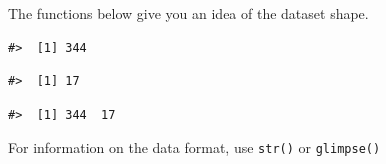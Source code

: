 \documentclass[letterpaper,9pt,twoside,]{pinp}
\begin{document}
The functions below give you an idea of the dataset shape.

\begin{Shaded}
\begin{Highlighting}[]
\end{Highlighting}
\end{Shaded}

\begin{ShadedResult}
\begin{verbatim}
#>  [1] 344
\end{verbatim}
\end{ShadedResult}

\begin{Shaded}
\begin{Highlighting}[]
\end{Highlighting}
\end{Shaded}

\begin{ShadedResult}
\begin{verbatim}
#>  [1] 17
\end{verbatim}
\end{ShadedResult}

\begin{Shaded}
\begin{Highlighting}[]
\end{Highlighting}
\end{Shaded}

\begin{ShadedResult}
\begin{verbatim}
#>  [1] 344  17
\end{verbatim}
\end{ShadedResult}

For information on the data format, use \texttt{str()} or
\texttt{glimpse()}

\begin{Shaded}
\begin{Highlighting}[]
\end{Highlighting}
\end{Shaded}
\end{document}
